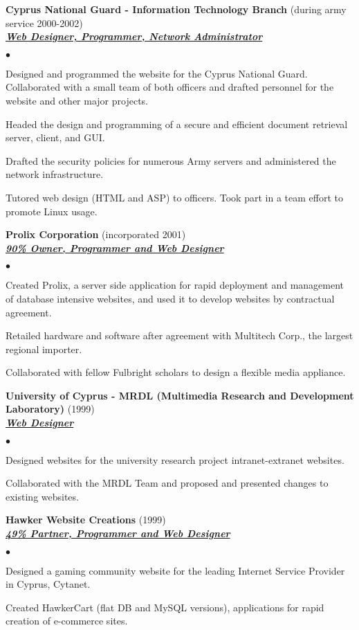 \documentclass{article}
\newcommand{\employer}[3]{{ \textbf{#1} (#2)\\ \underline{\textbf{\emph{#3}}}\\  }}
\newenvironment{achievements}{\begin{list}{$\bullet$}{\topsep 0pt \itemsep -2pt}}{\vspace*{4pt}\end{list}}
\begin{document}
\employer{Cyprus National Guard - Information Technology Branch}{during army service 2000-2002} {Web Designer, Programmer, Network Administrator}
	\begin{achievements}
	\item Designed and programmed the website for the Cyprus National Guard. Collaborated with a small team of both officers and drafted personnel for the website and other major projects.
	\item Headed the design and programming of a secure and efficient document retrieval server, client, and GUI.
	\item Drafted the security policies for numerous Army servers and administered the network infrastructure.
	\item Tutored web design (HTML and ASP) to officers. Took part in a team effort to promote Linux usage.
	\end{achievements}

\employer{Prolix Corporation}{incorporated 2001}{90\% Owner, Programmer and Web Designer}
	\begin{achievements}
	\item Created Prolix, a server side application for rapid deployment and management of database intensive websites, and used it to develop websites by contractual agreement.
	\item Retailed hardware and software after agreement with Multitech Corp., the largest regional importer.
	\item Collaborated with fellow Fulbright scholars to design a flexible media appliance.
	\end{achievements}

\employer{University of Cyprus - MRDL (Multimedia Research and Development Laboratory)}{1999}
	{Web Designer}
	\begin{achievements}
	\item Designed websites for the university research project intranet-extranet websites.
	\item Collaborated with the MRDL Team and proposed and presented changes to existing websites.
	\end{achievements}

\employer{Hawker Website Creations}{1999}{49\% Partner, Programmer and Web Designer}
	\begin{achievements}
	\item Designed a gaming community website for the leading Internet Service Provider in Cyprus, Cytanet.
	\item Created HawkerCart (flat DB and MySQL versions), applications for rapid creation of e-commerce sites.
	\end{achievements}
\end{document}
